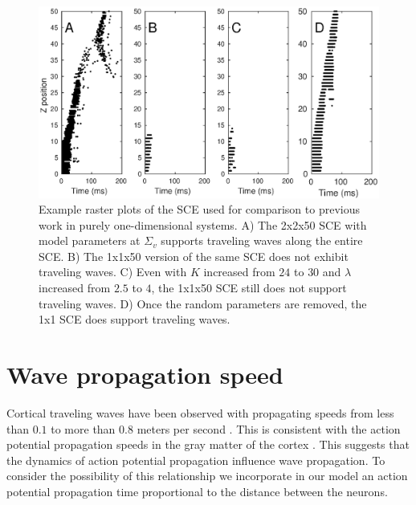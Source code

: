 \begin{figure}[!htb]
   \includegraphics[width=\textwidth]{fig/OneDimensionalComparison_RasterPlots}
   \caption{ Example raster plots of the SCE used for comparison to previous work in purely one-dimensional systems.
           A) The 2x2x50 SCE with model parameters at $\Sigma_v$ supports traveling waves along the entire SCE. 
	   B) The 1x1x50 version of the same SCE does not exhibit traveling waves.
	   C) Even with $K$ increased from $24$ to $30$ and $\lambda$ increased from $2.5$ to $4$, the 1x1x50 SCE still does not support traveling waves.
	   D) Once the random parameters are removed, the 1x1 SCE does support traveling waves. }
  \label{fig:OneDimensionalRasterPlots}
\end{figure}
\FloatBarrier

\section{Wave propagation speed} \label{sub:propagation_speed}
Cortical traveling waves have been observed with propagating speeds from less than $0.1$ to more than $0.8$ meters per second \citet{Sato2012}\citet{Golomb1997}\citet{Chervin1988}.
This is consistent with the action potential propagation speeds in the gray matter of the cortex \citet{Muller2018}. 
This suggests that the dynamics of action potential propagation influence wave propagation. 
To consider the possibility of this relationship we incorporate in our model an action potential propagation time proportional to the distance between the neurons.

